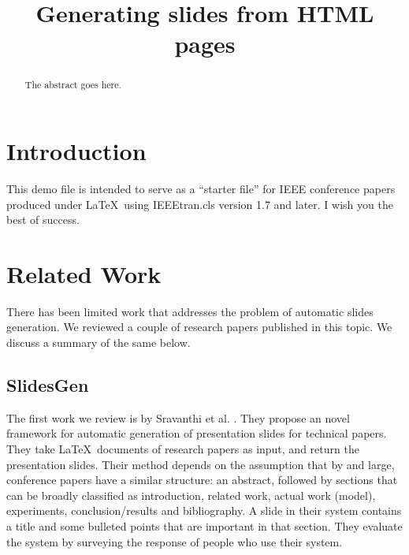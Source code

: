 \documentclass[conference]{IEEEtran}
\begin{document}
%
\title{Generating slides from HTML pages}


\author{
\and
{}
\and
{}
}


\maketitle


\begin{abstract}
The abstract goes here.
\end{abstract}


\section{Introduction}
This demo file is intended to serve as a ``starter file''
for IEEE conference papers produced under \LaTeX\ using
IEEEtran.cls version 1.7 and later.
I wish you the best of success. \cite{test}

\section{Related Work}
There has been limited work that addresses the problem of automatic slides generation.
We reviewed a couple of research papers published in this topic. We discuss a summary of the same
below.


\subsection{SlidesGen}
The first work we review is by Sravanthi et al. \cite{sravanthi}. They propose an
novel framework for automatic generation of presentation slides for technical papers.
They take \LaTeX\ documents of research papers as input, and return the presentation slides.
Their method depends on the assumption that by and large, conference papers have a similar structure:
an abstract, followed by sections that can be broadly classified as introduction, related work,
actual work (model), experiments, conclusion/results and bibliography.
A slide in their system contains a title and some bulleted points that are important in 
that section. They evaluate the system by surveying the response of people who use their system.
\end{document}
